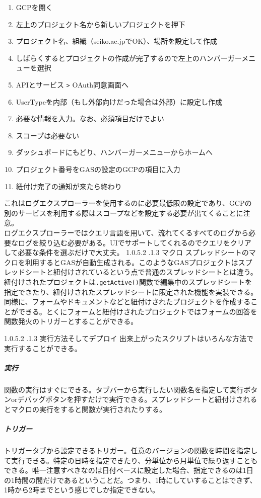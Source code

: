\documentclass[dvipdfmx,jb5]{jarticle}
\makeatletter
\newcommand{\subsubsubsection}{\@startsection{paragraph}{4}{\z@}%
    {1.0\Cvs \@plus.5\Cdp \@minus.2\Cdp}%
    {.1\Cvs \@plus.3\Cdp}%
    {\large \bfseries}
  }
\makeatother
\begin{document}
 \begin{enumerate}
 \item GCPを開く
 \item 左上のプロジェクト名から新しいプロジェクトを押下
 \item プロジェクト名、組織（seiko.ac.jpでOK）、場所を設定して作成
 \item しばらくするとプロジェクトの作成が完了するので左上のハンバーガーメニューを選択
 \item APIとサービス \verb|>| OAuth同意画面へ
 \item UserTypeを内部（もし外部向けだった場合は外部）に設定し作成
 \item 必要な情報を入力。なお、必須項目だけでよい
 \item スコープは必要ない
 \item ダッシュボードにもどり、ハンバーガーメニューからホームへ
 \item プロジェクト番号をGASの設定のGCPの項目に入力
 \item 紐付け完了の通知が来たら終わり
 \end{enumerate}
 これはログエクスプローラーを使用するのに必要最低限の設定であり、GCPの別のサービスを利用する際はスコープなどを設定する必要が出てくることに注意。
 \\
 
ログエクスプローラーではクエリ言語を用いて、流れてくるすべてのログから必要なログを絞り込む必要がある。UIでサポートしてくれるのでクエリをクリアして必要な条件を選ぶだけで大丈夫。
\subsubsubsection{マクロ}
スプレッドシートのマクロを利用するとGASが自動生成される。このようなGASプロジェクトはスプレッドシートと紐付けされているという点で普通のスプレッドシートとは違う。紐付けされたプロジェクトは\verb|.getActive()|関数で編集中のスプレッドシートを指定できたり、紐付けされたスプレッドシートに限定された機能を実装できる。
\\

同様に、フォームやドキュメントなどと紐付けされたプロジェクトを作成することができる。とくにフォームと紐付けされたプロジェクトではフォームの回答を関数発火のトリガーとすることができる。

\subsubsubsection{実行方法そしてデプロイ}
出来上がったスクリプトはいろんな方法で実行することができる。
\subparagraph{実行}
関数の実行はすぐにできる。タブバーから実行したい関数名を指定して実行ボタンorデバッグボタンを押すだけで実行できる。スプレッドシートと紐付けされるとマクロの実行をすると関数が実行されたりする。

\subparagraph{トリガー}
トリガータブから設定できるトリガー。任意のバージョンの関数を時間を指定して実行できる。特定の日時を指定できたり、分単位から月単位で繰り返すこともできる。唯一注意すべきなのは日付ベースに設定した場合、指定できるのは1日の1時間の間だけであるということだ。つまり、1時にしていすることはできず、1時から2時までという感じでしか指定できない。
\\
\end{document}
